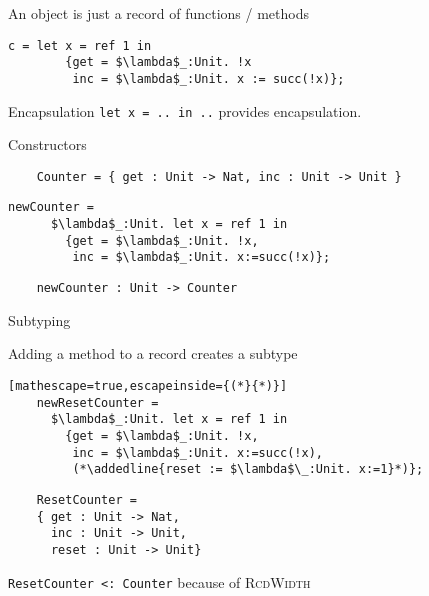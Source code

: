 \documentclass[presentation,xcolor=svgnames]{beamer}
\begin{document}
\begin{frame}[fragile]
  \begin{block}{An object is just a record of functions / methods}
    \begin{lstlisting}[mathescape=true]
    c = let x = ref 1 in
        {get = $\lambda$_:Unit. !x
         inc = $\lambda$_:Unit. x := succ(!x)};
    \end{lstlisting}
  \end{block}

  \begin{block}{Encapsulation}
    \texttt{let x = .. in ..} provides encapsulation.
  \end{block}


\end{frame}

\begin{frame}[fragile]{Constructors}
  \begin{lstlisting}
    Counter = { get : Unit -> Nat, inc : Unit -> Unit }
  \end{lstlisting}

  \begin{lstlisting}[mathescape=true]
    newCounter =
      $\lambda$_:Unit. let x = ref 1 in
        {get = $\lambda$_:Unit. !x,
         inc = $\lambda$_:Unit. x:=succ(!x)};
  \end{lstlisting}

  \begin{lstlisting}
    newCounter : Unit -> Counter
  \end{lstlisting}
\end{frame}


\newcommand{\addedline}[1]{\colorbox{ForestGreen}{\texttt{#1}}}

\begin{frame}[fragile]{Subtyping}
  \begin{block}{Adding a method to a record creates a subtype}
  \begin{lstlisting}[mathescape=true,escapeinside={(*}{*)}]
    newResetCounter =
      $\lambda$_:Unit. let x = ref 1 in
        {get = $\lambda$_:Unit. !x,
         inc = $\lambda$_:Unit. x:=succ(!x),
         (*\addedline{reset := $\lambda$\_:Unit. x:=1}*)};
  \end{lstlisting}
  \end{block}

  \begin{lstlisting}
    ResetCounter =
    { get : Unit -> Nat,
      inc : Unit -> Unit,
      reset : Unit -> Unit}
  \end{lstlisting}

  \texttt{ResetCounter <: Counter} because of \textsc{RcdWidth}

\end{frame}
\end{document}
